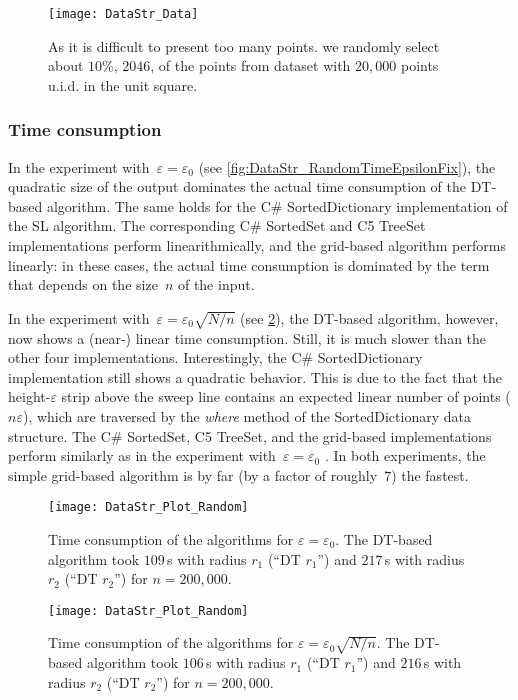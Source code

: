 \begin{figure}[tb]
	\centering
	\texttt{[image: DataStr\_Data]}
	\caption{As it is difficult to present too many points.
		we randomly select about $10\%$, $2046$,
		of the points from dataset with $20{,}000$ points
		u.i.d. in the unit square.
	}
	\label{fig:DataStr_RandomData}
\end{figure}

\subsubsection{Time consumption}
In the experiment with~$\varepsilon =\varepsilon_{0}$ 
(see \fig\ref{fig:DataStr_RandomTimeEpsilonFix}), 
the quadratic size of the output dominates the 
actual time consumption of the DT-based algorithm.
The same holds for the C\# SortedDictionary implementation of 
the SL algorithm. 
The 
corresponding C\# SortedSet and C5 TreeSet implementations 
perform 
linearithmically, and the grid-based algorithm performs 
linearly: in 
these cases, the actual time consumption is dominated by the 
term that 
depends on the size~$n$ of the input.


In the experiment with~$\varepsilon =\varepsilon_{0}\sqrt{N/n}$ 
(see \fig\ref{fig:DataStr_RandomTimeEpsilonDecrease}), 
the DT-based algorithm, however, now shows 
a (near-) linear time consumption. 
Still, it is much slower than the other four implementations. 
Interestingly, the C\# SortedDictionary 
implementation still shows a quadratic behavior. 
This is due to the fact 
that the height-$\varepsilon $ strip above the sweep line 
contains an expected linear number of points ($n\varepsilon$), 
which are traversed by the \emph{where} method 
of the SortedDictionary data structure. 
The C\# SortedSet, C5 TreeSet, and the grid-based 
implementations 
perform similarly as in the experiment 
with~$\varepsilon =\varepsilon_{0}$
. In both experiments, the simple grid-based algorithm is by 
far (by a factor of roughly~$7$) the fastest.

\begin{figure}[tb]	
	\centering
	\texttt{[image: DataStr\_Plot\_Random]}
	\caption{Time consumption of the algorithms for 
		$\varepsilon=\varepsilon_{0}$. 
		The DT-based algorithm took 
		$109\,$s with radius $r_1$ (``DT $r_1$'') and  
		$217\,$s with radius $r_2$ (``DT $r_2$'') 
		for $n=200,000$.}
	\label{fig:DataStr_RandomTimeEpsilonFix}
	\par\vspace{\intextsep} %
	\centering
	\texttt{[image: DataStr\_Plot\_Random]}
	\caption{Time consumption of the algorithms for
		$\varepsilon=\varepsilon_{0} \sqrt{N/n}$. 
		The DT-based algorithm took 
		$106\,$s with radius $r_1$ (``DT $r_1$'') and  
		$216\,$s with radius $r_2$ (``DT $r_2$'') for 
		$n=200{,}000$.}
	\label{fig:DataStr_RandomTimeEpsilonDecrease}
\end{figure}


